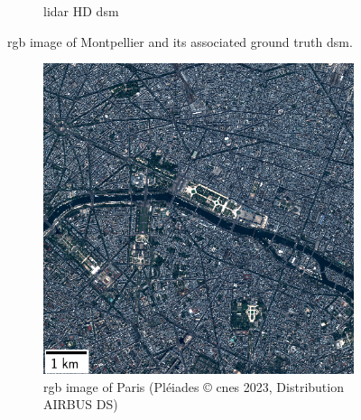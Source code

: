 \begin{figure}
\begin{subfigure}[t]{0.48\linewidth}
        \caption{\acrshort{lidar} HD \acrshort{dsm}}
        \label{fig:miniature_Montpellier_gt}
    \end{subfigure}
    \caption{\acrshort{rgb} image of Montpellier and its associated ground truth \acrshort{dsm}.}
    \label{fig:miniature_Montpellier}
\end{figure}

\begin{figure}
    \centering
    \begin{subfigure}[t]{0.48\linewidth}
        \flushleft
        \includegraphics[width=\linewidth]{Images/Chap_6/miniature_Paris.png}
        \caption{\acrshort{rgb} image of Paris (Pléiades © \acrshort{cnes} 2023, Distribution AIRBUS DS)}
        \label{fig:miniature_Paris_rgb}
    \end{subfigure}\hfill
    \begin{subfigure}[t]{0.48\linewidth}
        \flushright

\end{subfigure}
\end{figure}
